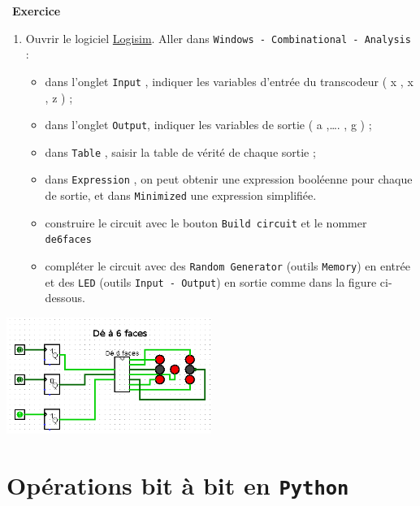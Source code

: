 \documentclass[
  11pt,
]{article}
\newcommand{\passthrough}[1]{#1}
\providecommand{\tightlist}{%
  \setlength{\itemsep}{0pt}\setlength{\parskip}{0pt}}
\newcounter{exo}
\newenvironment{exercice}[1]
{\par \medskip   \addtocounter{exo}{1} \noindent  
\begin{bclogo}[arrondi =0.1,   noborder = true, logo=\bccrayon, marge=4]{~\textbf{Exercice} \textbf{\theexo} {\itshape #1} }  \par}
{
\end{bclogo}
 \par \bigskip }
\newcounter{def}
\newcounter{logi}
\begin{document}
\begin{exercice}{}
\begin{enumerate}
\def\labelenumi{\arabic{enumi}.}
\setcounter{enumi}{1}
\tightlist
\item
  Ouvrir le logiciel \href{http://www.cburch.com/logisim/}{Logisim}.
  Aller dans
  \passthrough{\lstinline!Windows - Combinational - Analysis!} :

  \begin{itemize}
  \tightlist
  \item
    dans l'onglet \passthrough{\lstinline!Input!} , indiquer les
    variables d'entrée du transcodeur ( x , x , z ) ;
  \item
    dans l'onglet \passthrough{\lstinline!Output!}, indiquer les
    variables de sortie ( a ,\ldots. , g ) ;
  \item
    dans \passthrough{\lstinline!Table!} , saisir la table de vérité de
    chaque sortie ;
  \item
    dans \passthrough{\lstinline!Expression!} , on peut obtenir une
    expression booléenne pour chaque de sortie, et dans
    \passthrough{\lstinline!Minimized!} une expression simplifiée.
  \item
    construire le circuit avec le bouton
    \passthrough{\lstinline!Build circuit!} et le nommer
    \passthrough{\lstinline!de6faces!}
  \item
    compléter le circuit avec des
    \passthrough{\lstinline!Random Generator!} (outils
    \passthrough{\lstinline!Memory!}) en entrée et des
    \passthrough{\lstinline!LED!} (outils
    \passthrough{\lstinline!Input - Output!}) en sortie comme dans la
    figure ci-dessous.
  \end{itemize}
\end{enumerate}

\includegraphics[width=0.5\textwidth,height=\textheight]{images/de_6_faces.png}\\

\end{exercice}

\hypertarget{opuxe9rations-bit-uxe0-bit-en-python}{%
\section{\texorpdfstring{Opérations bit à bit en
\texttt{Python}}{Opérations bit à bit en Python}}\label{opuxe9rations-bit-uxe0-bit-en-python}}
\end{document}
